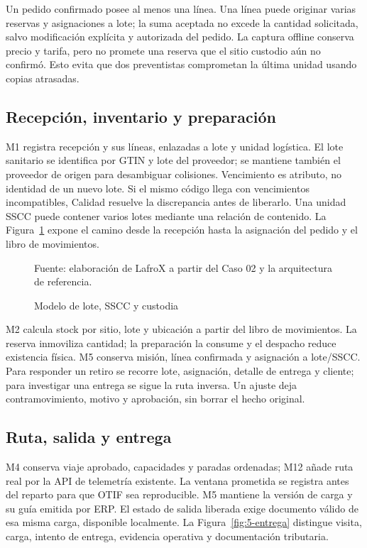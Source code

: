 Un pedido confirmado posee al menos una línea. Una línea puede originar varias reservas y asignaciones a lote; la suma aceptada no excede la cantidad solicitada, salvo modificación explícita y autorizada del pedido. La captura offline conserva precio y tarifa, pero no promete una reserva que el sitio custodio aún no confirmó. Esto evita que dos preventistas comprometan la última unidad usando copias atrasadas.

\subsection{Recepción, inventario y preparación}
M1 registra recepción y sus líneas, enlazadas a lote y unidad logística. El lote sanitario se identifica por GTIN y lote del proveedor; se mantiene también el proveedor de origen para desambiguar colisiones. Vencimiento es atributo, no identidad de un nuevo lote. Si el mismo código llega con vencimientos incompatibles, Calidad resuelve la discrepancia antes de liberarlo. Una unidad SSCC puede contener varios lotes mediante una relación de contenido.
La Figura~\ref{fig:5-custodia} expone el camino desde la recepción hasta la asignación del pedido y el libro de movimientos.

\begin{figure}[htbp]
\centering

\caption{Modelo de lote, SSCC y custodia}
\label{fig:5-custodia}
{\fontsize{9pt}{11pt}\selectfont Fuente: elaboración de LafroX a partir del Caso 02 y la arquitectura de referencia.}
\end{figure}\FloatBarrier

M2 calcula stock por sitio, lote y ubicación a partir del libro de movimientos. La reserva inmoviliza cantidad; la preparación la consume y el despacho reduce existencia física. M5 conserva misión, línea confirmada y asignación a lote/SSCC. Para responder un retiro se recorre lote, asignación, detalle de entrega y cliente; para investigar una entrega se sigue la ruta inversa. Un ajuste deja contramovimiento, motivo y aprobación, sin borrar el hecho original.

\subsection{Ruta, salida y entrega}
M4 conserva viaje aprobado, capacidades y paradas ordenadas; M12 añade ruta real por la API de telemetría existente. La ventana prometida se registra antes del reparto para que OTIF sea reproducible. M5 mantiene la versión de carga y su guía emitida por ERP. El estado de salida liberada exige documento válido de esa misma carga, disponible localmente.
La Figura~\ref{fig:5-entrega} distingue visita, carga, intento de entrega, evidencia operativa y documentación tributaria.

